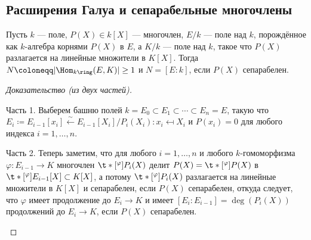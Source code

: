 \documentclass[
	extrafontsizes,
	11pt,
	hyphens,
]{memoir}
\begin{document}
\subsection{Расширения Галуа и сепарабельные многочлены}

%
%

\begin{theorem}
Пусть \(k\) --- поле, \(P(X) \in k[X]\) --- многочлен, \(E/k\) --- поле над \(k\), порождённое как \(k\)-алгебра корнями \(P(X)\) 	в \(E\), а \(K/k\) --- поле над \(k\), такое что \(P(X)\) разлагается на линейные множители в \(K[X]\).
Тогда \(N \coloneqq \lvert \Hom_{k\ring}(E,K) \rvert \geq 1\) и \(N = [E : k]\), если \(P(X)\) сепарабелен.
\end{theorem}

\begin{proof}[Доказательство (из двух частей)]
~\begin{proofdescription}

\item[Часть 1.]
Выберем башню полей
\(k = E_0 \subset E_1 \subset \cdots{} \subset E_n = E\),
такую что \(E_i \coloneqq E_{i-1}[x_i] \xleftarrow{\sim} E_{i-1}[X_i] /P_i(X_i) : x_i \mapsfrom X_i\) и \(P(x_i)=0\) для любого
индекса
\(i = 1, \dots{}, n\).

\item[Часть 2.]
Теперь заметим, что для любого \(i = 1, \dots{}, n\) и любого \(k\)-го\-мо\-мор\-физ\-ма \(\varphi : E_{i-1} \to K\) многочлен \(\t*[^{\varphi}]{\smash{P_i}}{}(X)\) делит \(P(X) = \t*[^{\varphi}]{P}{}(X)\) в \(\t*[^{\varphi}]{\smash{E_{i-1}}}{}[X] \subset K[X]\),
а потому
\(\t*[^{\varphi}]{\smash{P_i}}{}(X)\) разлагается на линейные множители в \(K[X]\) и сепарабелен, если \(P(X)\) сепарабелен,
откуда следует, что
\(\varphi\) имеет продолжение до \(E_i \to K\) и имеет \([E_i : E_{i-1}] = \deg(P_i(X))\) продолжений до \(E_i \to K\), если \(P(X)\) сепарабелен.
\qedhere

\end{proofdescription}
\end{proof}
\end{document}
